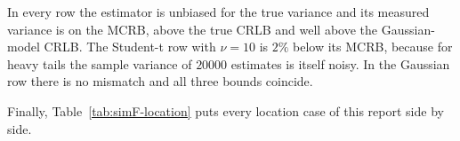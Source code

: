 \documentclass[11pt]{article}
\numberwithin{figure}{section}
\numberwithin{equation}{section}
\begin{document}
\begin{table}[H]
\centering
{}
\caption{Estimating the noise variance with a Gaussian model. All bounds and the measured variance
are multiplied by $N = 100$. $20000$ trials.}
\label{tab:simF-variance}
\end{table}

In every row the estimator is unbiased for the true variance and its measured variance is on the
MCRB, above the true CRLB and well above the Gaussian-model CRLB. The Student-t row with $\nu = 10$
is $2\%$ below its MCRB, because for heavy tails the sample variance of $20000$ estimates is itself
noisy. In the Gaussian row there is no mismatch and all three bounds coincide.

Finally, Table~\ref{tab:simF-location} puts every location case of this report side by side.
\end{document}
